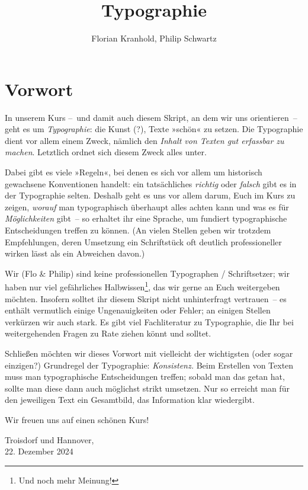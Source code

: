 \documentclass[british,ngerman]{scrbook}
\author{Florian Kranhold, Philip Schwartz}
\title {Typographie}
\begin{document}
\frontmatter


\chapter*{Vorwort}
In unserem Kurs --~und damit auch diesem Skript, an dem wir uns
orientieren~-- geht es um \emph{Typographie}: die Kunst (?), Texte
»schön« zu setzen.  Die Typographie dient vor allem einem Zweck,
nämlich den \emph{Inhalt von Texten gut erfassbar zu machen}.
Letztlich ordnet sich diesem Zweck alles unter.

Dabei gibt es viele »Regeln«, bei denen es sich vor allem um
historisch gewachsene Konventionen handelt: ein tatsächliches
\emph{richtig} oder \emph{falsch} gibt es in der Typographie selten.
Deshalb geht es uns vor allem darum, Euch im Kurs zu zeigen,
\emph{worauf} man typographisch überhaupt alles achten kann und was es
für \emph{Möglichkeiten} gibt~-- so erhaltet ihr eine Sprache, um
fundiert typographische Entscheidungen treffen zu können.  (An vielen
Stellen geben wir trotzdem Empfehlungen, deren Umsetzung ein
Schriftstück oft deutlich professioneller wirken lässt als ein
Abweichen davon.)

Wir (Flo \& Philip) sind keine professionellen Typographen /
Schriftsetzer; wir haben nur viel gefährliches Halbwissen\footnote{Und
  noch mehr Meinung!}, das wir gerne an Euch weitergeben möchten.
Insofern solltet ihr diesem Skript nicht unhinterfragt vertrauen~-- es
enthält vermutlich einige Ungenauigkeiten oder Fehler; an einigen
Stellen verkürzen wir auch stark.  Es gibt viel Fachliteratur zu
Typographie, die Ihr bei weitergehenden Fragen zu Rate ziehen könnt
und solltet.

Schließen möchten wir dieses Vorwort mit vielleicht der wichtigsten
(oder sogar einzigen?) Grundregel der Typographie: \emph{Konsistenz.}
Beim Erstellen von Texten muss man typographische Entscheidungen
treffen; sobald man das getan hat, sollte man diese dann auch
möglichst strikt umsetzen.  Nur so erreicht man für den jeweiligen
Text ein Gesamtbild, das Information klar wiedergibt.

Wir freuen uns auf einen schönen Kurs!

\begin{flushright}
  Troisdorf und Hannover,\\22. Dezember 2024
\end{flushright}

\mainmatter




\end{document}
